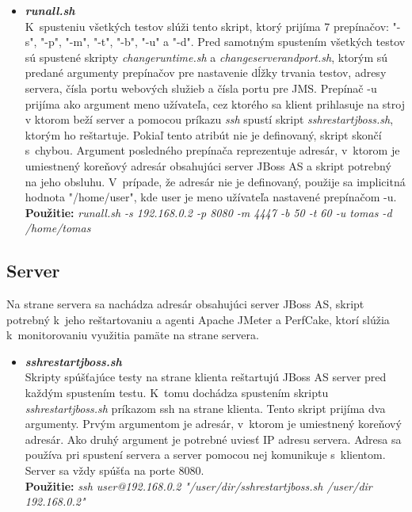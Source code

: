 \documentclass[12pt,oneside,final]{fithesis-utf8}
\newcommand\underscore[1]{\underline{\hspace{8pt}}}
\begin{document}
\begin{itemize}
\item \textit{\textbf{run\underscore{}all.sh}}\\
K~spusteniu všetkých testov slúži tento skript, ktorý prijíma 7 prepínačov: "{}-s"{}, "{}-p"{}, "{}-m"{}, "{}-t"{}, "{}-b"{}, "{}-u"{} a "{}-d"{}. Pred samotným spustením všetkých testov sú spustené skripty \textit{change\underscore{}runtime.sh} a \textit{change\underscore{}server\underscore{}and\underscore{}port.sh}, ktorým sú predané argumenty prepínačov pre nastavenie dĺžky trvania testov, adresy servera, čísla portu webových služieb a čísla portu pre JMS. Prepínač -u prijíma ako argument meno užívateľa, cez ktorého sa klient prihlasuje na stroj v ktorom beží server a pomocou príkazu \textit{ssh} spustí skript \textit{ssh\underscore{}restart\underscore{}jboss.sh}, ktorým ho reštartuje. Pokiaľ tento atribút nie je definovaný, skript skončí s~chybou. Argument posledného prepínača reprezentuje adresár, v~ktorom je umiestnený koreňový adresár obsahujúci server JBoss AS a skript potrebný na jeho obsluhu. V~prípade, že adresár nie je definovaný, použije sa implicitná hodnota "{/home/user}"{}, kde user je meno užívateľa nastavené prepínačom -u.\\
\textbf{Použitie:} \textit{run\underscore{}all.sh -s 192.168.0.2 -p 8080 -m 4447 -b 50 -t 60 -u tomas -d /home/tomas}

\end{itemize}


\subsection{Server}
Na strane servera sa nachádza adresár obsahujúci server JBoss AS, skript potrebný k~jeho reštartovaniu a agenti Apache JMeter a PerfCake, ktorí slúžia k~monitorovaniu využitia pamäte na strane servera.

\begin{itemize}

\item \textit{\textbf{ssh\underscore{}restart\underscore{}jboss.sh}}\\
Skripty spúšťajúce testy na strane klienta reštartujú JBoss AS server pred každým spustením testu. K~tomu dochádza spustením skriptu \textit{ssh\underscore{}restart\underscore{}jboss.sh} príkazom ssh na strane klienta. Tento skript prijíma dva argumenty. Prvým argumentom je adresár, v~ktorom je umiestnený koreňový adresár. Ako druhý argument je potrebné uviesť IP adresu servera. Adresa sa používa pri spustení servera a server pomocou nej komunikuje s~klientom. Server sa vždy spúšťa na porte 8080.\\
\textbf{Použitie:} \textit{ssh user@192.168.0.2 "/user/dir/ssh\underscore{}restart\underscore{}jboss.sh /user/dir 192.168.0.2"}
\end{itemize}
\end{document}
